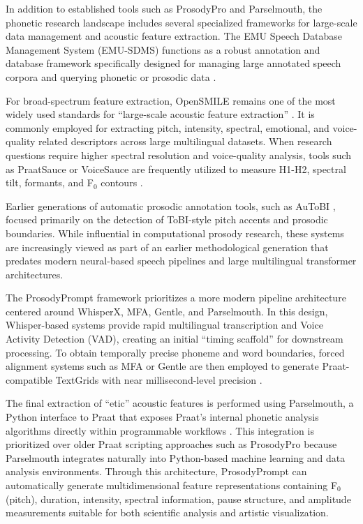 In addition to established tools such as ProsodyPro and Parselmouth, the phonetic research landscape includes several specialized frameworks for large-scale data management and acoustic feature extraction. The EMU Speech Database Management System (EMU-SDMS) functions as a robust annotation and database framework specifically designed for managing large annotated speech corpora and querying phonetic or prosodic data \cite{winkelmann2017emu}. 

For broad-spectrum feature extraction, OpenSMILE remains one of the most widely used standards for ``large-scale acoustic feature extraction'' \cite{eyben2010opensmile}. It is commonly employed for extracting pitch, intensity, spectral, emotional, and voice-quality related descriptors across large multilingual datasets. When research questions require higher spectral resolution and voice-quality analysis, tools such as PraatSauce or VoiceSauce are frequently utilized to measure H1-H2, spectral tilt, formants, and F$_0$ contours \cite{shue2011voicesauce}. 

Earlier generations of automatic prosodic annotation tools, such as AuToBI \cite{rosenberg2010autobi}, focused primarily on the detection of ToBI-style pitch accents and prosodic boundaries. While influential in computational prosody research, these systems are increasingly viewed as part of an earlier methodological generation that predates modern neural-based speech pipelines and large multilingual transformer architectures.

The ProsodyPrompt framework prioritizes a more modern pipeline architecture centered around WhisperX, MFA, Gentle, and Parselmouth. In this design, Whisper-based systems provide rapid multilingual transcription and Voice Activity Detection (VAD), creating an initial ``timing scaffold'' for downstream processing. To obtain temporally precise phoneme and word boundaries, forced alignment systems such as MFA or Gentle are then employed to generate Praat-compatible TextGrids with near millisecond-level precision \cite{mcauliffe2017mfa}. 

The final extraction of ``etic'' acoustic features is performed using Parselmouth, a Python interface to Praat that exposes Praat’s internal phonetic analysis algorithms directly within programmable workflows \cite{jadoul2018parselmouth}. This integration is prioritized over older Praat scripting approaches such as ProsodyPro because Parselmouth integrates naturally into Python-based machine learning and data analysis environments. Through this architecture, ProsodyPrompt can automatically generate multidimensional feature representations containing F$_0$ (pitch), duration, intensity, spectral information, pause structure, and amplitude measurements suitable for both scientific analysis and artistic visualization.

